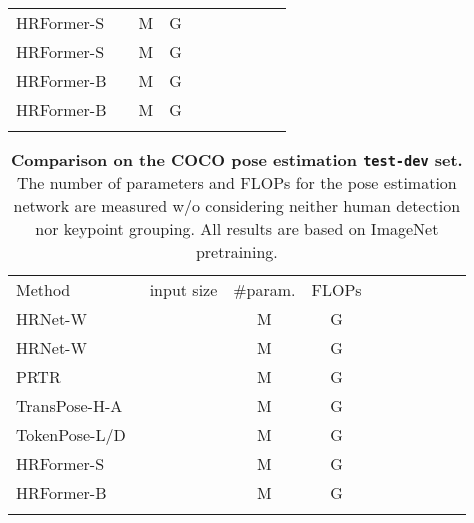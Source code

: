 \documentclass{article}
\begin{document}
\begin{table}[h]
{\begin{tabular}{l|ccc|cccccc}
      HRFormer-S                                &           & M                   & G                  &                 &             &  &  &  &  \\
      HRFormer-S                                &           & M                   & G                  &                 &             &  &  &  &  \\
      HRFormer-B                                &           & M                  & G                 &                 &             &  &  &  &  \\
      HRFormer-B                                &           & M                  & G                 &                 &             &  &  &  &  \\
      \shline
    \end{tabular}
  }
\end{table}


\renewcommand{\arraystretch}{1.1}
\begin{table}[h]
  \footnotesize
  \centering
  \setlength{\tabcolsep}{5pt}
  \renewcommand{\arraystretch}{1.3}
  \caption{\textbf{Comparison on the COCO pose estimation \texttt{test-dev} set.}
    The number of parameters and FLOPs
    for the pose estimation network are measured w/o considering
    neither human detection nor keypoint grouping.
    All results are based on ImageNet pretraining.
  }
  \label{tab:coco_pose_test}
  \footnotesize
  {
    \begin{tabular}{l|ccc|cccccc}
      \shline
      Method                                    & input size               & \#param.                 & FLOPs                   &
                             &  &  &  &  &                                              \\\shline
      HRNet-W~\cite{XLW19}                  &           & M                  & G                 &                 &             &  &  &  &  \\
      HRNet-W~\cite{XLW19}                  &           & M                  & G                 &                 &             &  &  &  &  \\
      PRTR~\cite{li2021pose}                    &           & M                  & G                 &                 &             &  &  &  &  \\
      TransPose-H-A~\cite{yang2020transpose} &           & M                  & G                 &                 &             &  &  &  &     \\
      TokenPose-L/D~\cite{li2021tokenpose}  &           & M                  & G                 &                 &             &  &  &  &  \\\hline
      HRFormer-S                                &           & M                   & G                  &                 &             &  &  &  &  \\
      HRFormer-B                                &           & M                  & G                 &                 &             &  &  &  &  \\
      \shline
    \end{tabular}
  }
\end{table}
\end{document}
